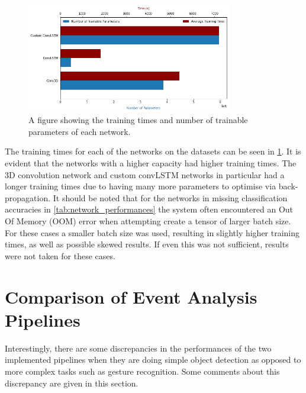 \begin{figure}[htb]
    \centering
    \includegraphics[width=0.8\textwidth]{testingandresults/images/training_time_and_trainable_parameters.png}
    \caption{A figure showing the training times and number of trainable parameters of each network.}
    \label{fig:training_times_and_trainable_parameters}
\end{figure}

The training times for each of the networks on the datasets can be seen in \cref{fig:training_times_and_trainable_parameters}. It is evident that the networks with a higher capacity had higher training times. The 3D convolution network and custom convLSTM networks in particular had a longer training times due to having many more parameters to optimise via back-propagation. It should be noted that for the networks in missing classification accuracies in \cref{tab:network_performances} the system often encountered an Out Of Memory (OOM) error when attempting create a tensor of larger batch size. For these cases a smaller batch size was used, resulting in slightly higher training times, as well as possible skewed results. If even this was not sufficient, results were not taken for these cases.

\section{Comparison of Event Analysis Pipelines}

Interestingly, there are some discrepancies in the performances of the two implemented pipelines when they are doing simple object detection as opposed to more complex tasks such as gesture recognition. Some comments about this discrepancy are given in this section.

